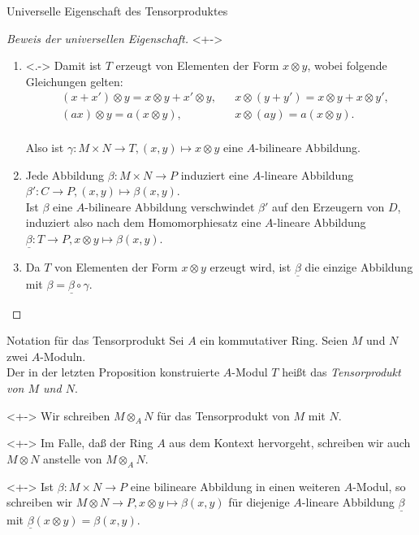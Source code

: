 \begin{frame}{Universelle Eigenschaft des Tensorproduktes}
	\begin{proof}[Beweis der universellen Eigenschaft]<+->
		\begin{enumerate}[<+->]
		\item<.->
			Damit ist \(T\) erzeugt von Elementen der Form \(x \otimes y\),
			wobei folgende Gleichungen gelten:
			\begin{align*}
				& (x + x') \otimes y = x \otimes y + x' \otimes y, &
				& x \otimes (y + y') = x \otimes y + x \otimes y', \\
				& (ax) \otimes y = a (x \otimes y), &
				& x \otimes (ay) = a (x \otimes y).
			\end{align*}
			\\
			Also ist \(\gamma\colon M \times N
			\to T, (x, y) \mapsto x \otimes y\) eine \(A\)-bilineare Abbildung.
		\item
			Jede Abbildung \(\beta\colon M \times N \to P\) induziert eine \(A\)-lineare Abbildung
			\(\beta'\colon C \to P, (x, y) \mapsto \beta(x, y)\).
			\\
			Ist \(\beta\) eine
			\(A\)-bilineare Abbildung verschwindet \(\beta'\) auf den Erzeugern von \(D\), induziert also
			nach dem Homomorphiesatz eine \(A\)-lineare Abbildung \(\underline\beta\colon T \to P,
			x \otimes y \mapsto \beta(x, y)\).
		\item
			Da \(T\) von Elementen der Form \(x \otimes y\) erzeugt wird, ist \(\underline\beta\) die einzige
			Abbildung mit \(\beta = \underline\beta \circ \gamma\).
			\qedhere
		\end{enumerate}
	\end{proof}
\end{frame}

\begin{frame}{Notation für das Tensorprodukt}
	Sei \(A\) ein kommutativer Ring. Seien \(M\) und \(N\) zwei \(A\)-Moduln.
	\\
	Der in der letzten Proposition konstruierte \(A\)-Modul \(T\) heißt das \emph{Tensorprodukt von
	\(M\) und \(N\)}.
	\begin{notation}<+->
		Wir schreiben
		\(M \otimes_A N\) für das Tensorprodukt von \(M\) mit \(N\).
	\end{notation}
	\begin{visibleenv}<+->
		Im Falle, daß der Ring \(A\) aus dem Kontext hervorgeht, schreiben wir auch \(M \otimes N\) anstelle
		von \(M \otimes_A N\).
	\end{visibleenv}
	\begin{notation}<+->
		Ist \(\beta\colon M \times N \to P\) eine bilineare Abbildung in einen weiteren \(A\)-Modul, so
		schreiben wir \(M \otimes N \to P, x \otimes y \mapsto \beta(x, y)\) für diejenige \(A\)-lineare
		Abbildung \(\underline\beta\) mit \(\underline\beta(x \otimes y) = \beta(x, y)\).
	\end{notation}
\end{frame}
	
